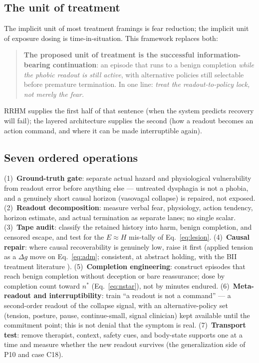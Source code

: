 \documentclass[9pt,twocolumn]{article}
\begin{document}
\subsection{The unit of treatment}
The implicit unit of most treatment framings is fear reduction; the implicit unit of exposure dosing is time-in-situation. This framework replaces both:
\begin{quote}
\textbf{The proposed unit of treatment is the successful information-bearing continuation}: an episode that runs to a benign completion \emph{while the phobic readout is still active}, with alternative policies still selectable before premature termination. In one line: \emph{treat the readout-to-policy lock, not merely the fear.}
\end{quote}
RRHM supplies the first half of that sentence (when the system predicts recovery will fail); the layered architecture supplies the second (how a readout becomes an action command, and where it can be made interruptible again).

\subsection{Seven ordered operations}
(1)~\textbf{Ground-truth gate}: separate actual hazard and physiological vulnerability from readout error before anything else --- untreated dysphagia is not a phobia, and a genuinely short causal horizon (vasovagal collapse) is repaired, not exposed. (2)~\textbf{Readout decomposition}: measure verbal fear, physiology, action tendency, horizon estimate, and actual termination as separate lanes; no single scalar. (3)~\textbf{Tape audit}: classify the retained history into harm, benign completion, and censored escape, and test for the $E\!\approx\!H$ mis-tally of Eq.~\ref{eq:lesion}. (4)~\textbf{Causal repair}: where causal recoverability is genuinely low, raise it first (applied tension as a $\Delta g$ move on Eq.~\ref{eq:adm}; consistent, at abstract holding, with the BII treatment literature \cite{ayala2009}). (5)~\textbf{Completion engineering}: construct episodes that reach benign completion without deception or bare reassurance; dose by completion count toward $n^{*}$ (Eq.~\ref{eq:nstar}), not by minutes endured. (6)~\textbf{Meta-readout and interruptibility}: train ``a readout is not a command'' --- a second-order readout of the collapse signal, with an alternative-policy set (tension, posture, pause, continue-small, signal clinician) kept available until the commitment point; this is not denial that the symptom is real. (7)~\textbf{Transport test}: remove therapist, context, safety cues, and body-state supports one at a time and measure whether the new readout survives (the generalization side of P10 and case C18).
\end{document}

